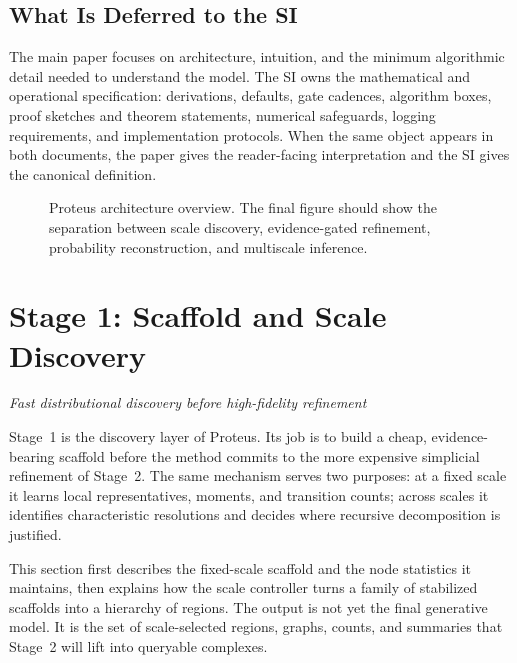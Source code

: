 \documentclass[11pt]{article}
\newcommand{\sectionsubtitle}[1]{\vspace{-0.25em}\noindent\textit{#1}\par\vspace{0.75em}}
\theoremstyle{definition}
\theoremstyle{plain}
\begin{document}
\subsection{What Is Deferred to the SI}
The main paper focuses on architecture, intuition, and the minimum algorithmic detail needed to understand the model. The SI owns the mathematical and operational specification: derivations, defaults, gate cadences, algorithm boxes, proof sketches and theorem statements, numerical safeguards, logging requirements, and implementation protocols. When the same object appears in both documents, the paper gives the reader-facing interpretation and the SI gives the canonical definition.

\begin{figure}[t]
    \centering
    \caption{Proteus architecture overview. The final figure should show the separation between scale discovery, evidence-gated refinement, probability reconstruction, and multiscale inference.}
    \label{fig:architecture-overview}
\end{figure}

\section{Stage 1: Scaffold and Scale Discovery}
\label{sec:stage1}
\sectionsubtitle{Fast distributional discovery before high-fidelity refinement}

Stage~1 is the discovery layer of Proteus. Its job is to build a cheap, evidence-bearing scaffold before the method commits to the more expensive simplicial refinement of Stage~2. The same mechanism serves two purposes: at a fixed scale it learns local representatives, moments, and transition counts; across scales it identifies characteristic resolutions and decides where recursive decomposition is justified.

This section first describes the fixed-scale scaffold and the node statistics it maintains, then explains how the scale controller turns a family of stabilized scaffolds into a hierarchy of regions. The output is not yet the final generative model. It is the set of scale-selected regions, graphs, counts, and summaries that Stage~2 will lift into queryable complexes.
\end{document}
